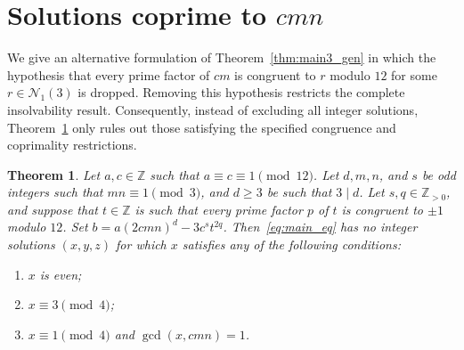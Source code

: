 \documentclass[11pt,a4paper]{amsart}
\newcommand{\ZZ}{\mathbb{Z}}
\theoremstyle{plain}
\newtheorem{theorem}{Theorem}[section]
\theoremstyle{definition}
\begin{document}
\section{Solutions coprime to \texorpdfstring{$cmn$}{cmn}}\label{sec:coprime}

We give an alternative formulation of Theorem~\ref{thm:main3_gen} in which the hypothesis that every prime factor of $cm$ is congruent to $r$ modulo $12$ for some $r \in
\mathcal{N}_1(3)$ is dropped. Removing this hypothesis restricts the complete insolvability result. Consequently, instead of excluding all integer solutions, Theorem~\ref{thm:coprime_3} only rules out those satisfying the specified congruence and coprimality restrictions.

\begin{theorem}\label{thm:coprime_3}
Let $a, c \in \ZZ$ such that $a \equiv c \equiv 1 \pmod{12}$. Let $d,m, n $, and $s$ be odd integers such that $mn \equiv 1 \pmod{3}$, and $d \ge 3$ be such that $3\mid d$. Let $s, q \in \ZZ_{>0}$, and suppose that $t \in \ZZ$ is such that every prime factor $p$ of $t$ is congruent to $\pm 1$ modulo $12$. Set $b = a (2cmn)^d - 3 c^s t^{2q}$. Then~\eqref{eq:main_eq} has no integer solutions $(x,y,z)$ for which $x$ satisfies any of the following conditions:
\begin{enumerate}[label=(\alph*)]
    \item $x$ is even;
    \item $x \equiv 3 \pmod 4$;
    \item $x \equiv 1 \pmod 4$ and $\gcd(x, cmn) = 1$.
\end{enumerate}
\end{theorem}
\end{document}
